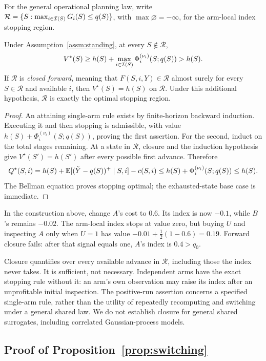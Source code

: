 For the general operational planning law, write
$\mathcal R=\{S:\max_{i\in\mathcal{I}(S)}G_i(S)\le q(S)\}$,
with $\max\varnothing=-\infty$, for the arm-local index stopping region.
\begin{proposition}\label{prop:stop-any}
Under Assumption~\ref{assm:standing}, at every $S\notin\mathcal R$,
\[
V^\star(S)\ge h(S)+\max_{i\in\mathcal{I}(S)}\Phi_i^{(\nu_i)}(S;q(S))>h(S).
\]
If $\mathcal R$ is \emph{closed forward}, meaning that $F(S,i,Y)\in\mathcal R$ almost surely
for every $S\in\mathcal R$ and available $i$, then $V^\star(S)=h(S)$ on $\mathcal R$.
Under this additional hypothesis, $\mathcal R$ is exactly the optimal stopping region.
\end{proposition}
\begin{proof}
An attaining single-arm rule exists by finite-horizon backward induction.
Executing it and then stopping is admissible, with value
$h(S)+\Phi_i^{(\nu_i)}(S;q(S))$, proving the first assertion.
For the second, induct on the total stages remaining. At a state in $\mathcal R$, closure and
the induction hypothesis give $V^\star(S')=h(S')$ after every possible first advance.
Therefore
\[
Q^\star(S,i)=h(S)+\mathbb{E}[(\tilde Y-q(S))^+\mid S,i]-c(S,i)
\le h(S)+\Phi_i^{(\nu_i)}(S;q(S))\le h(S).
\]
The Bellman equation proves stopping optimal; the exhausted-state base case is immediate.
\end{proof}

\begin{example}\label{ex:shared-stop}
In the construction above, change $A$'s cost to $0.6$. Its index is now $-0.1$, while $B$'s
remains $-0.02$. The arm-local index stops at value zero, but buying $U$ and inspecting $A$
only when $U=1$ has value $-0.01+\tfrac12(1-0.6)=0.19$. Forward closure fails: after that
signal equals one, $A$'s index is $0.4>q_0$.
\end{example}

Closure quantifies over every available advance in $\mathcal R$, including those
the index never takes. It is sufficient, not necessary. Independent arms have
the exact stopping rule without it: an arm's own observation may raise its index
after an unprofitable initial inspection. The positive-run assertion concerns a
specified single-arm rule, rather than the utility of repeatedly recomputing and
switching under a general shared law. We do not establish closure for general
shared surrogates, including correlated Gaussian-process models.

\subsection{Proof of Proposition~\ref{prop:switching}}
\label{app:switching}

